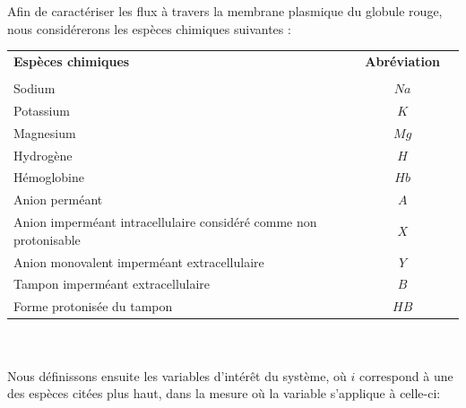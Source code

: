 \documentclass[a4paper,fleqn]{article}
\begin{document}
Afin de caractériser les flux à travers la membrane plasmique du globule rouge, nous considérerons les espèces chimiques suivantes :

\begin{tabular}{p{11cm}cr}
\textbf{Espèces chimiques}                                                   & \textbf{Abréviation} \\
\\
Sodium                                                            & ${Na}$   \\
Potassium                                                         & $K$    \\
Magnesium                                                         & ${Mg}$   \\
Hydrogène                                                          & $H$    \\
Hémoglobine                                                       & ${Hb}$   \\
Anion perméant                                                    & $A$    \\
Anion imperméant intracellulaire considéré comme non protonisable & $X$    \\
Anion monovalent imperméant extracellulaire                       & $Y$    \\
Tampon imperméant extracellulaire                                 & $B$    \\
Forme protonisée du tampon                                        & ${HB}$   \\

\end{tabular}\\
\\


Nous définissons ensuite les variables d'intérêt du système, où $i$ correspond à une des espèces citées plus haut, dans la mesure où la variable s'applique à celle-ci: \\
\\
\end{document}
